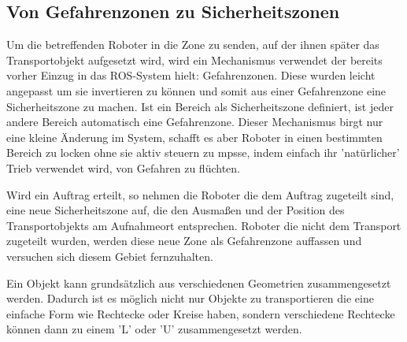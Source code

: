 \subsection*{Von Gefahrenzonen zu Sicherheitszonen}

Um die betreffenden Roboter in die Zone zu senden, auf der ihnen später das Transportobjekt aufgesetzt wird, wird ein Mechanismus verwendet der bereits vorher Einzug in das ROS-System hielt: Gefahrenzonen. Diese wurden leicht angepasst um sie invertieren zu können und somit aus einer Gefahrenzone eine Sicherheitszone zu machen. Ist ein Bereich als Sicherheitszone definiert, ist jeder andere Bereich automatisch eine Gefahrenzone.
Dieser Mechanismus birgt nur eine kleine Änderung im System, schafft es aber Roboter in einen bestimmten Bereich zu locken ohne sie aktiv steuern zu mpsse, indem einfach ihr 'natürlicher' Trieb verwendet wird, von Gefahren zu flüchten.

Wird ein Auftrag erteilt, so nehmen die Roboter die dem Auftrag zugeteilt sind, eine neue Sicherheitszone auf, die den Ausmaßen und der Position des Transportobjekts am Aufnahmeort entsprechen. Roboter die nicht dem Transport zugeteilt wurden, werden diese neue Zone als Gefahrenzone auffassen und versuchen sich diesem Gebiet fernzuhalten.

Ein Objekt kann grundsätzlich aus verschiedenen Geometrien zusammengesetzt werden. Dadurch ist es möglich nicht nur Objekte zu transportieren die eine einfache Form wie Rechtecke oder Kreise haben, sondern verschiedene Rechtecke können dann zu einem 'L' oder 'U' zusammengesetzt werden.

